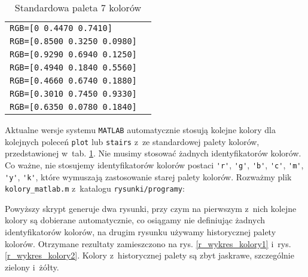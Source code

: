 
\begin{table}[H]
\caption{Standardowa paleta 7 kolorów}
\label{r_zestaw_kolorow}
\renewcommand{\arraystretch}{1.25}
	\centering
	\begin{small}
		\begin{tabular}{|p{5cm}|p{4cm}|}
			\hline
			\verb|RGB=[0 0.4470 0.7410]| & \cellcolor{niebieski}\\
			\verb|RGB=[0.8500 0.3250 0.0980]| & \cellcolor{czerwony}\\
			\verb|RGB=[0.9290 0.6940 0.1250]| & \cellcolor{zolty}\\
			\verb|RGB=[0.4940 0.1840 0.5560]| & \cellcolor{fioletowy}\\
			\verb|RGB=[0.4660 0.6740 0.1880]| & \cellcolor{zielony}\\
			\verb|RGB=[0.3010 0.7450 0.9330]| & \cellcolor{jasnoniebieski}\\
			\verb|RGB=[0.6350 0.0780 0.1840]| & \cellcolor{ciemnioczerwony}\\
			\hline
		\end{tabular}
	\end{small}
\end{table}

Aktualne wersje systemu \texttt{MATLAB} automatycznie stosują kolejne kolory dla kolejnych poleceń \verb+plot+ lub \verb+stairs+ z~ze standardowej palety kolorów, przedstawionej w~tab. \ref{r_zestaw_kolorow}. Nie musimy stosować żadnych identyfikatorów kolorów. Co ważne, nie stosujemy identyfikatorów kolorów postaci \verb+'r'+, \verb+'g'+, \verb+'b'+, \verb+'c'+, \verb+'m'+, \verb+'y'+, \verb+'k'+, które wymuszają zastosowanie starej palety kolorów. Rozważmy plik \verb+kolory_matlab.m+ z~katalogu \verb+rysunki/programy+:

Powyższy skrypt generuje dwa rysunki, przy czym na pierwszym z~nich kolejne kolory są dobierane automatycznie, co osiągamy nie definiując żadnych identyfikatorów kolorów, na drugim rysunku używamy historycznej palety kolorów. Otrzymane rezultaty zamieszczono na rys. \ref{r_wykres_kolory1} i~rys. \ref{r_wykres_kolory2}. Kolory z~historycznej palety są zbyt jaskrawe, szczególnie zielony i~żółty.

